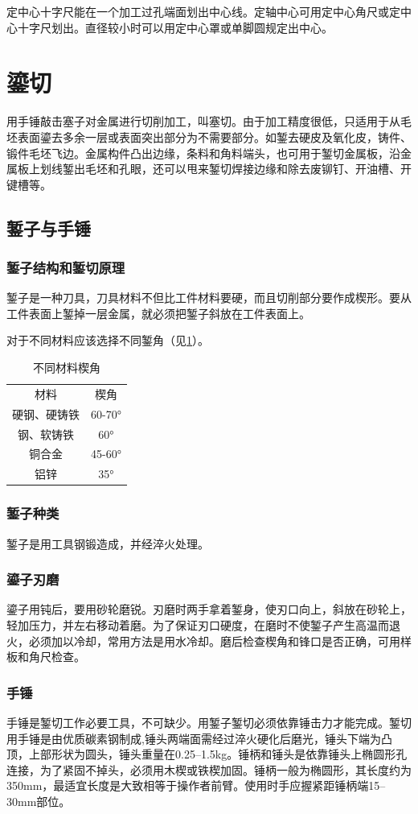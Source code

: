 \documentclass{ctexbook}
\begin{document}
定中心十字尺能在一个加工过孔端面划出中心线。定轴中心可用定中心角尺或定中心十字尺划出。直径较小时可以用定中心罩或单脚圆规定出中心。
\section{鎏切}
用手锤敲击塞子对金属进行切削加工，叫塞切。由于加工精度很低，只适用于从毛坯表面鎏去多余一层或表面突出部分为不需要部分。如錾去硬皮及氧化皮，铸件、锻件毛坯飞边。金属构件凸出边缘，条料和角料端头，也可用于錾切金属板，沿金属板上划线錾出毛坯和孔眼，还可以甩来錾切焊接边缘和除去废铆钉、开油槽、开键槽等。
\subsection{錾子与手锤}
\subsubsection{錾子结构和錾切原理}
錾子是一种刀具，刀具材料不但比工件材料要硬，而且切削部分要作成楔形。要从工件表面上錾掉一层金属，就必须把錾子斜放在工件表面上。

对于不同材料应该选择不同錾角（见\ref{tab:xiejiao}）。

\begin{table}[htbp]
	\centering
	\caption{不同材料楔角}
	\begin{tabular}{cc}
		材料    &  楔角 \\
		硬钢、硬铸铁 & 60-70° \\
		钢、软铸铁 & 60° \\
		铜合金   & 45-60° \\
		铝锌    & 35° \\
	\end{tabular}%
	\label{tab:xiejiao}%
\end{table}%
\subsubsection{錾子种类}
錾子是用工具钢锻造成，并经淬火处理。
\subsubsection{鎏子刃磨}
鎏子用钝后，要用砂轮磨锐。刃磨时两手拿着錾身，使刃口向上，斜放在砂轮上，轻加压力，并左右移动着磨。为了保证刃口硬度，在磨时不使錾子产生高温而退火，必须加以冷却，常用方法是用水冷却。磨后检查楔角和锋口是否正确，可用样板和角尺检查。
\subsubsection{手锤}
手锤是錾切工作必要工具，不可缺少。用錾子錾切必须依靠锤击力才能完成。錾切用手锤是由优质碳素钢制成,锤头两端面需经过淬火硬化后磨光，锤头下端为凸顶，上部形状为圆头，锤头重量在0.25--1.5kg。锤柄和锤头是依靠锤头上椭圆形孔连接，为了紧固不掉头，必须用木楔或铁楔加固。锤柄一般为椭圆形，其长度约为350mm，最适宜长度是大致相等于操作者前臂。使用时手应握紧距锤柄端15--30mm部位。
\end{document}
